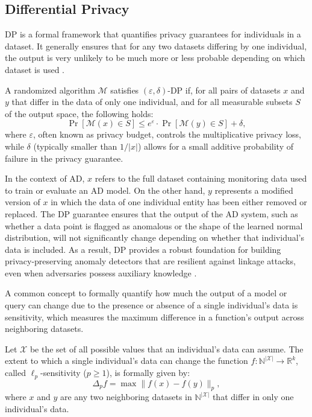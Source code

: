 \subsection{Differential Privacy} \label{s:background_dp}

DP is a formal framework that quantifies privacy guarantees for individuals in a dataset. It generally ensures that for any two datasets differing by one individual, the output is very unlikely to be much more or less probable depending on which dataset is used \citep{dwork2014algorithmic}.

\begin{definition}
A randomized algorithm $\mathcal{M}$ satisfies $(\varepsilon, \delta)$-DP if, for all pairs of datasets $x$ and $y$ that differ in the data of only one individual, and for all measurable subsets $S$ of the output space, the following holds:
\[
\Pr[\mathcal{M}(x) \in S] \leq e^{\varepsilon} \cdot \Pr[\mathcal{M}(y) \in S] + \delta,
\]
where $\varepsilon$, often known as privacy budget, controls the multiplicative privacy loss, while $\delta$ (typically smaller than $1/|x|$) allows for a small additive probability of failure in the privacy guarantee.
\end{definition}

In the context of AD, $x$ refers to the full dataset containing monitoring data used to train or evaluate an AD model. On the other hand, $y$ represents a modified version of $x$ in which the data of one individual entity has been either removed or replaced. The DP guarantee ensures that the output of the AD system, such as whether a data point is flagged as anomalous or the shape of the learned normal distribution, will not significantly change depending on whether that individual’s data is included. As a result, DP provides a robust foundation for building privacy-preserving anomaly detectors that are resilient against linkage attacks, even when adversaries possess auxiliary knowledge \citep[pg.~22]{dwork2014algorithmic}.

A common concept to formally quantify how much the output of a model or query can change due to the presence or absence of a single individual’s data is sensitivity, which measures the maximum difference in a function’s output across neighboring datasets.

\begin{definition}\label{def:sensitivity}
Let $\mathcal{X}$ be the set of all possible values that an individual’s data can assume. The extent to which a single individual’s data can change the function $f : \mathbb{N}^{|\mathcal{X}|} \rightarrow \mathbb{R}^k$, called $\ell_p$-sensitivity ($p \geq 1$), is formally given by:
\[
\Delta_p f = \max \|f(x) - f(y)\|_p,
\]
where $x$ and $y$ are any two neighboring datasets in $\mathbb{N}^{|\mathcal{X}|}$ that differ in only one individual’s data.
\end{definition}

